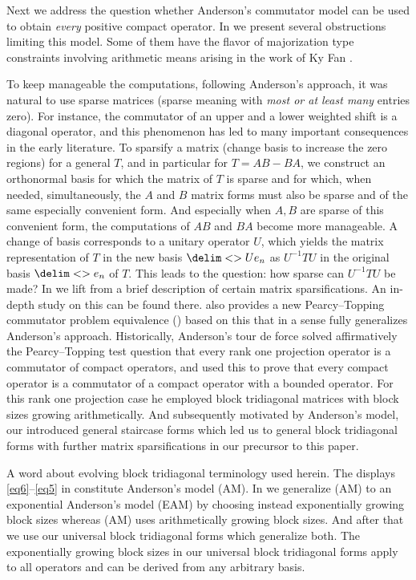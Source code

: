 \documentclass[10pt,reqno]{amsart}
\theoremstyle{remark}
\newcommand{\seq}{\delim<>}
\numberwithin{equation}{section}
\begin{document}
Next we address the question whether Anderson's commutator model \cite{And-1977-JRAM} can be used to obtain \emph{every} positive compact operator.
In  we present several obstructions limiting this model.
Some of them have the flavor of majorization type constraints involving arithmetic means arising in the work of Ky Fan  \cite{Fan-1951-PNASUSA}.


To keep manageable the computations, following Anderson's approach, it was natural to use sparse matrices (sparse meaning with \emph{most or at least many} entries zero).
For instance, the commutator of an upper and a lower weighted shift is a diagonal operator, and this phenomenon has led to many important consequences in the early literature.
To sparsify a matrix (change basis to increase the zero regions) for a general $T$, and in particular for $T=AB-BA$, we construct an orthonormal basis for which the matrix of $T$ is {sparse}
and for which, when needed,
simultaneously, the $A$ and $B$ matrix forms must also be  sparse and of the same especially convenient form.
And especially when $A,B$ are sparse of this convenient form,
the computations of $AB$ and $BA$ become more manageable.
A change of basis corresponds to a unitary operator $U$, which yields the matrix  representation of $T$ in the new basis $\seq{Ue_n}$ as $U^{-1}TU$ in the original basis $\seq{e_n}$ of $T$.
This leads to the question: how sparse can $U^{-1}TU$ be made?
In  we lift from \cite{PPW-2020-TmloVLOt} a brief description of certain matrix sparsifications.
An in-depth study on this can be found there.
 also provides a new Pearcy--Topping commutator problem equivalence () based on this that in a sense fully generalizes Anderson's approach.
Historically, Anderson's tour de force solved affirmatively the Pearcy--Topping test question that every rank one projection operator is a commutator of compact operators, and used this to prove that every compact operator is  a commutator of a compact operator with a bounded operator.
For this rank one projection case he employed block tridiagonal matrices with block sizes growing arithmetically.
And subsequently motivated by Anderson's model, our \cite{Wei-1980-IEOT} introduced general staircase forms which led us to general block tridiagonal forms with further matrix sparsifications in our precursor \cite{PPW-2020-TmloVLOt} to this paper.

A word about evolving block tridiagonal terminology used herein.
The displays \eqref{eq6}--\eqref{eq5} in  constitute Anderson's model (AM).
In  we generalize (AM) to an exponential Anderson's model (EAM) by choosing instead exponentially growing block sizes whereas (AM) uses arithmetically growing block sizes.
And after that we use our universal block tridiagonal forms which generalize both.
The exponentially growing block sizes in our universal block tridiagonal forms apply to all operators and can be derived from any arbitrary basis.
\end{document}
